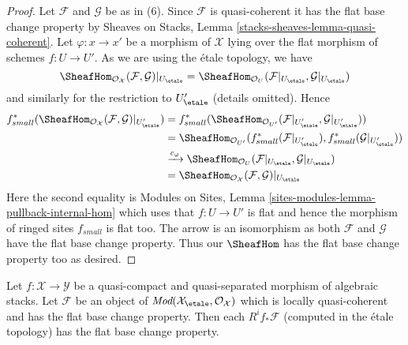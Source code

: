 \begin{proof}
\medskip\noindent
Let $\mathcal{F}$ and $\mathcal{G}$ be as in (6). Since $\mathcal{F}$
is quasi-coherent it has the flat base change property by
Sheaves on Stacks, Lemma \ref{stacks-sheaves-lemma-quasi-coherent}.
Let $\varphi : x \to x'$ be a morphism of $\mathcal{X}$ lying
over the flat morphism of schemes $f : U \to U'$.
As we are using the \'etale topology, we have
$$
\SheafHom_{\mathcal{O}_\mathcal{X}}(\mathcal{F}, \mathcal{G})|_{U_\etale} =
\SheafHom_{\mathcal{O}_U}(\mathcal{F}|_{U_\etale}, \mathcal{G}|_{U_\etale})
$$
and similarly for the restriction to $U'_\etale$ (details omitted). Hence
\begin{align*}
f_{small}^*(
\SheafHom_{\mathcal{O}_\mathcal{X}}(\mathcal{F}, \mathcal{G})|_{U'_\etale})
& =
f_{small}^*(
\SheafHom_{\mathcal{O}_{U'}}(
\mathcal{F}|_{U'_\etale}, \mathcal{G}|_{U'_\etale})) \\
& =
\SheafHom_{\mathcal{O}_{U'}}(
f_{small}^*(\mathcal{F}|_{U'_\etale}),
f_{small}^*(\mathcal{G}|_{U'_\etale})) \\
& \xrightarrow{c_\varphi}
\SheafHom_{\mathcal{O}_U}(\mathcal{F}|_{U_\etale}, \mathcal{G}|_{U_\etale}) \\
& =
\SheafHom_{\mathcal{O}_\mathcal{X}}(\mathcal{F}, \mathcal{G})|_{U_\etale}
\end{align*}
Here the second equality is
Modules on Sites, Lemma \ref{sites-modules-lemma-pullback-internal-hom}
which uses that $f : U \to U'$ is flat and hence the morphism
of ringed sites $f_{small}$ is flat too.
The arrow is an isomorphism as both $\mathcal{F}$ and $\mathcal{G}$
have the flat base change property. Thus our $\SheafHom$
has the flat base change property too as desired.
\end{proof}

\begin{lemma}
\label{lemma-flat-comparison}
Let $f : \mathcal{X} \to \mathcal{Y}$ be a quasi-compact and
quasi-separated morphism of algebraic stacks. Let 
$\mathcal{F}$ be an object of
$\textit{Mod}(\mathcal{X}_\etale, \mathcal{O}_\mathcal{X})$
which is locally quasi-coherent and has the flat base change property.
Then each $R^if_*\mathcal{F}$ (computed in the \'etale topology)
has the flat base change property.
\end{lemma}

